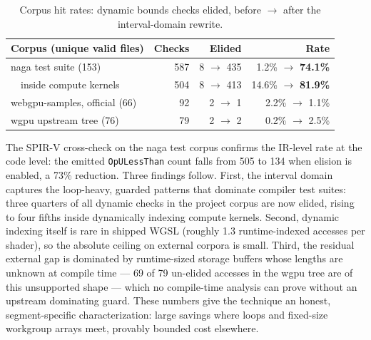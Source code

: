\documentclass[11pt,a4paper]{article}
\begin{document}
\begin{table}[htbp]
\centering
\caption{Corpus hit rates: dynamic bounds checks elided, before $\rightarrow$ after
the interval-domain rewrite.}
\label{tab:corpus}
\small
\begin{tabular}{lrrr}
\toprule
Corpus (unique valid files) & Checks & Elided & Rate \\
\midrule
naga test suite (153) & 587 & 8 $\rightarrow$ 435 & 1.2\% $\rightarrow$ \textbf{74.1\%} \\
~~inside compute kernels & 504 & 8 $\rightarrow$ 413 & 14.6\% $\rightarrow$ \textbf{81.9\%} \\
webgpu-samples, official (66) & 92 & 2 $\rightarrow$ 1 & 2.2\% $\rightarrow$ 1.1\% \\
wgpu upstream tree (76) & 79 & 2 $\rightarrow$ 2 & 0.2\% $\rightarrow$ 2.5\% \\
\bottomrule
\end{tabular}
\end{table}

The SPIR-V cross-check on the naga test corpus confirms the IR-level rate
at the code level: the emitted \texttt{OpULessThan} count falls from 505 to
134 when elision is enabled, a 73\% reduction. Three findings follow.
First, the interval domain captures the loop-heavy, guarded patterns that
dominate compiler test suites: three quarters of all dynamic checks in the
project corpus are now elided, rising to four fifths inside dynamically
indexing compute kernels. Second, dynamic indexing itself is rare in
shipped WGSL (roughly 1.3 runtime-indexed accesses per shader), so the
absolute ceiling on external corpora is small. Third, the residual external
gap is dominated by runtime-sized storage buffers whose lengths are unknown
at compile time --- 69 of 79 un-elided accesses in the wgpu tree are of this
unsupported shape --- which no compile-time analysis can prove without an
upstream dominating guard. These numbers give the technique an honest,
segment-specific characterization: large savings where loops and
fixed-size workgroup arrays meet, provably bounded cost elsewhere.
\end{document}
